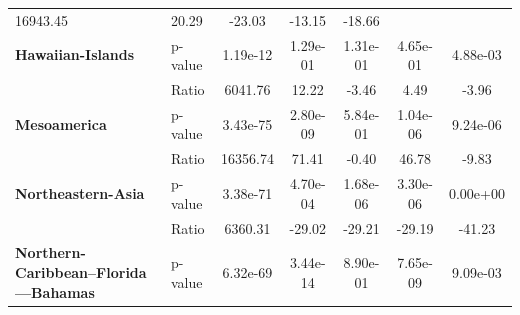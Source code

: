 \begin{table}[H]
{\begin{tabular}{llccccc}
            16943.45                                            & 20.29    &
            -23.03
                                                                & -13.15   &
            -18.66
            \\
            \textbf{Hawaiian-Islands}                           & p-value  &
            1.19e-12                                            & 1.29e-01 &
            1.31e-01                                            & 4.65e-01 &
            4.88e-03
            \\
            \textbf{}                                           & Ratio    &
            6041.76                                             & 12.22    &
            -3.46
                                                                & 4.49     &
            -3.96
            \\
            \textbf{Mesoamerica}                                & p-value  &
            3.43e-75                                            & 2.80e-09 &
            5.84e-01                                            & 1.04e-06 &
            9.24e-06
            \\
            \textbf{}                                           & Ratio    &
            16356.74                                            & 71.41    &
            -0.40
                                                                & 46.78    &
            -9.83
            \\
            \textbf{Northeastern-Asia}                          & p-value  &
            3.38e-71                                            & 4.70e-04 &
            1.68e-06                                            & 3.30e-06 &
            0.00e+00
            \\
            \textbf{}                                           & Ratio    &
            6360.31                                             & -29.02   &
            -29.21
                                                                & -29.19   &
            -41.23
            \\
            \textbf{Northern-Caribbean--Florida---Bahamas}      &
            p-value                                             &
            6.32e-69                                            &
            3.44e-14                                            &
            8.90e-01                                            &
            7.65e-09                                            &
            9.09e-03
            \\

\end{tabular}}
\end{table}
